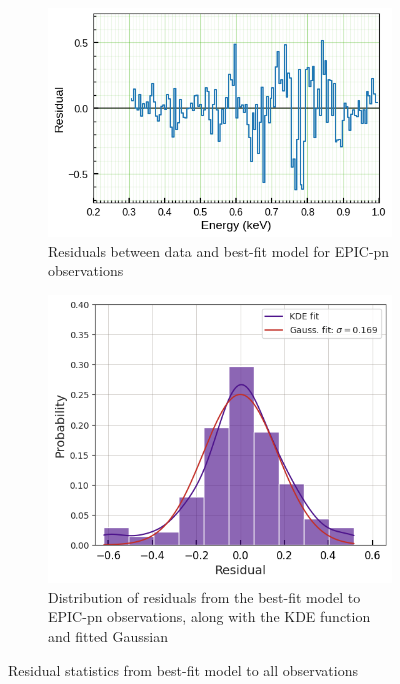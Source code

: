 	\begin{figure}[!htb]
        \centering
        \begin{subfigure}[b]{0.51\textwidth}
            \includegraphics[width=\textwidth]{figures/resid/mr-vel-0111150101-pn_resid.png}
            \caption{Residuals between data and best-fit model for EPIC-pn observations}
            \label{fig:pn:resid}
        \end{subfigure}
        \hfill
        \begin{subfigure}[b]{0.39\textwidth}
            \includegraphics[width=\textwidth]{figures/resid/mr-vel-0111150101-pn_resid-hist.png}
	        \caption{Distribution of residuals from the best-fit model to EPIC-pn observations, along with the KDE function and fitted Gaussian}
	        \label{fig:pn:resid-hist}
        \end{subfigure}
        \caption{Residual statistics from best-fit model to all observations}
        \label{fig:all-obs:resid-stats}
    \end{figure}
    
